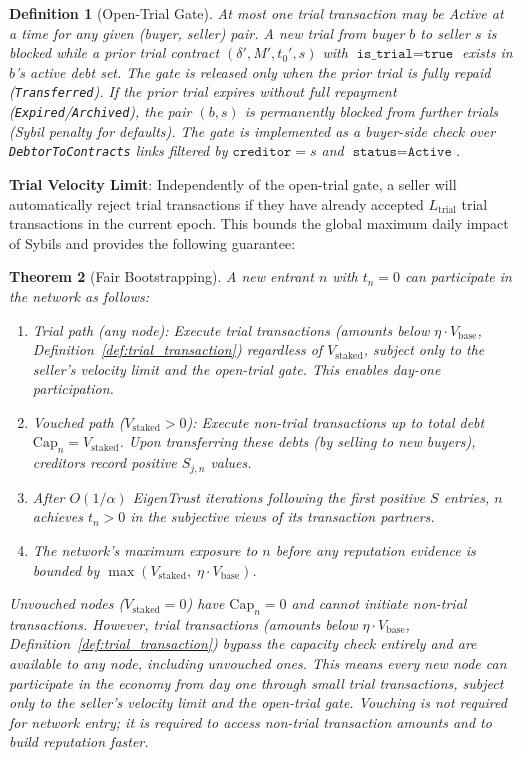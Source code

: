 \documentclass[11pt]{article}
\newtheorem{theorem}{Theorem}[section]
\newtheorem{definition}[theorem]{Definition}
\begin{document}
\begin{definition}[Open-Trial Gate]\label{def:open_trial_gate}
At most one trial transaction may be \emph{Active} at a time for any given (buyer, seller) pair. A new trial from buyer $b$ to seller $s$ is blocked while a prior trial contract $(\delta', M', t_0', s)$ with $\texttt{is\_trial} = \texttt{true}$ exists in $b$'s active debt set. The gate is released \emph{only} when the prior trial is fully repaid (\texttt{Transferred}). If the prior trial expires without full repayment (\texttt{Expired}/\texttt{Archived}), the pair $(b, s)$ is \emph{permanently} blocked from further trials (Sybil penalty for defaults). The gate is implemented as a buyer-side check over \texttt{DebtorToContracts} links filtered by $\texttt{creditor} = s$ and $\texttt{status} = \texttt{Active}$.
\end{definition}

\textbf{Trial Velocity Limit}: Independently of the open-trial gate, a seller will automatically reject trial transactions if they have already accepted $L_{\text{trial}}$ trial transactions in the current epoch. This bounds the global maximum daily impact of Sybils and provides the following guarantee:

\begin{theorem}[Fair Bootstrapping]\label{thm:bootstrap}
A new entrant $n$ with $t_n = 0$ can participate in the network as follows:
\begin{enumerate}
    \item \emph{Trial path (any node):} Execute trial transactions (amounts below $\eta \cdot V_{\text{base}}$, Definition~\ref{def:trial_transaction}) regardless of $V_{\text{staked}}$, subject only to the seller's velocity limit and the open-trial gate. This enables day-one participation.
    \item \emph{Vouched path ($V_{\text{staked}} > 0$):} Execute non-trial transactions up to total debt $\text{Cap}_n = V_{\text{staked}}$. Upon transferring these debts (by selling to new buyers), creditors record positive $S_{j,n}$ values.
    \item After $O(1/\alpha)$ EigenTrust iterations following the first positive $S$ entries, $n$ achieves $t_n > 0$ in the subjective views of its transaction partners.
    \item The network's maximum exposure to $n$ before any reputation evidence is bounded by $\max(V_{\text{staked}},\; \eta \cdot V_{\text{base}})$.
\end{enumerate}
Unvouched nodes ($V_{\text{staked}} = 0$) have $\text{Cap}_n = 0$ and cannot initiate non-trial transactions. However, \emph{trial transactions} (amounts below $\eta \cdot V_{\text{base}}$, Definition~\ref{def:trial_transaction}) bypass the capacity check entirely and are available to any node, including unvouched ones. This means every new node can participate in the economy from day one through small trial transactions, subject only to the seller's velocity limit and the open-trial gate. Vouching is not required for network entry; it is required to access non-trial transaction amounts and to build reputation faster.
\end{theorem}
\end{document}
